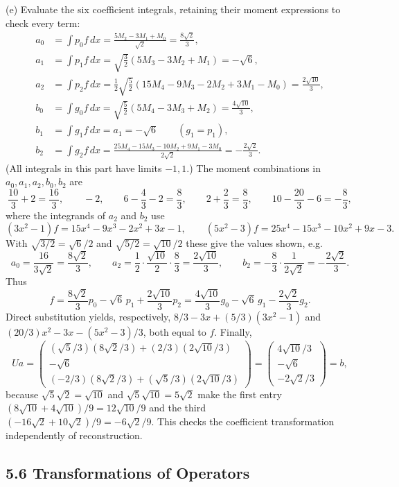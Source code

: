 (e) Evaluate the six coefficient integrals, retaining their moment
expressions to check every term:
\begin{align*}
a_0&=\int p_0f\,dx=\frac{5M_2-3M_1+M_0}{\sqrt2}
=\frac{8\sqrt2}{3},\\
a_1&=\int p_1f\,dx=\sqrt{\frac32}(5M_3-3M_2+M_1)=-\sqrt6,\\
a_2&=\int p_2f\,dx
=\frac12\sqrt{\frac52}(15M_4-9M_3-2M_2+3M_1-M_0)
=\frac{2\sqrt{10}}3,\\
b_0&=\int g_0f\,dx=\sqrt{\frac52}(5M_4-3M_3+M_2)
=\frac{4\sqrt{10}}3,\\
b_1&=\int g_1f\,dx=a_1=-\sqrt6\qquad(g_1=p_1),\\
b_2&=\int g_2f\,dx
=\frac{25M_4-15M_3-10M_2+9M_1-3M_0}{2\sqrt2}
=-\frac{2\sqrt2}{3}.
\end{align*}
(All integrals in this part have limits $-1,1$.) The moment
combinations in $a_0,a_1,a_2,b_0,b_2$ are
\[
\frac{10}3+2=\frac{16}3,\qquad -2,\qquad 6-\frac43-2=\frac83,\qquad
2+\frac23=\frac83,\qquad 10-\frac{20}3-6=-\frac83,
\]
where the integrands of $a_2$ and $b_2$ use
\[
(3x^2-1)f=15x^4-9x^3-2x^2+3x-1,\qquad
(5x^2-3)f=25x^4-15x^3-10x^2+9x-3.
\]
With $\sqrt{3/2}=\sqrt6/2$ and $\sqrt{5/2}=\sqrt{10}/2$ these give the
values shown, e.g.
\[
a_0=\frac{16}{3\sqrt2}=\frac{8\sqrt2}3,\qquad
a_2=\frac12\cdot\frac{\sqrt{10}}2\cdot\frac83=\frac{2\sqrt{10}}3,\qquad
b_2=-\frac83\cdot\frac1{2\sqrt2}=-\frac{2\sqrt2}3.
\]
Thus
\[
\boxed{f=\frac{8\sqrt2}{3}p_0-\sqrt6\,p_1+\frac{2\sqrt{10}}3p_2
=\frac{4\sqrt{10}}3g_0-\sqrt6\,g_1-\frac{2\sqrt2}{3}g_2.}
\]
Direct substitution yields, respectively,
$8/3-3x+(5/3)(3x^2-1)$ and
$(20/3)x^2-3x-(5x^2-3)/3$, both equal to $f$.
Finally,
\[
Ua=\begin{pmatrix}
(\sqrt5/3)(8\sqrt2/3)+(2/3)(2\sqrt{10}/3)\\
-\sqrt6\\
(-2/3)(8\sqrt2/3)+(\sqrt5/3)(2\sqrt{10}/3)
\end{pmatrix}
=\begin{pmatrix}4\sqrt{10}/3\\-\sqrt6\\-2\sqrt2/3\end{pmatrix}=b,
\]
because $\sqrt5\sqrt2=\sqrt{10}$ and $\sqrt5\sqrt{10}=5\sqrt2$ make the
first entry $(8\sqrt{10}+4\sqrt{10})/9=12\sqrt{10}/9$ and the third
$(-16\sqrt2+10\sqrt2)/9=-6\sqrt2/9$. This checks the coefficient
transformation independently of reconstruction.

\subsection*{5.6 Transformations of Operators}

